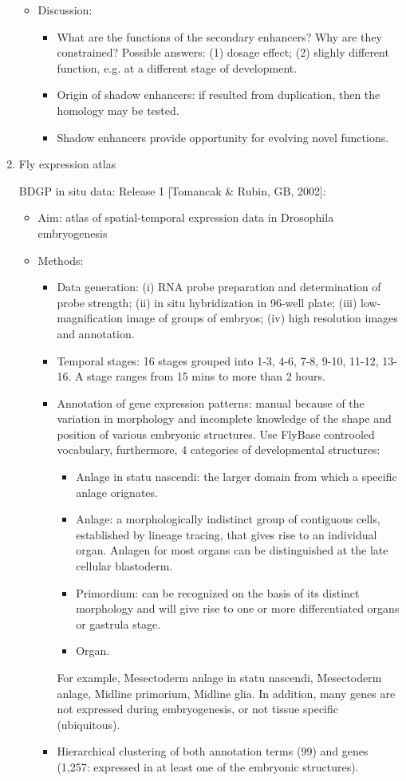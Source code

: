 \documentclass{report}
\begin{document}
\begin{enumerate}
\begin{itemize}
		\item Discussion: 
		\begin{itemize}
			\item What are the functions of the secondary enhancers? Why are they constrained? Possible answers: (1) dosage effect; (2) slighly different function, e.g. at a different stage of development. 
			\item Origin of shadow enhancers: if resulted from duplication, then the homology may be tested. 
			\item Shadow enhancers provide opportunity for evolving novel functions. 
		\end{itemize}
	\end{itemize}
	
	\item{Fly expression atlas}
	
	BDGP in situ data: Release 1 [Tomancak \& Rubin, GB, 2002]:
	\begin{itemize}
		\item Aim: atlas of spatial-temporal expression data in Drosophila embryogenesis
		
		\item Methods: 
		\begin{itemize}
			\item Data generation: (i) RNA probe preparation and determination of probe strength; (ii) in situ hybridization in 96-well plate; (iii) low-magnification image of groups of embryos; (iv) high resolution images and annotation. 
			\item Temporal stages: 16 stages grouped into 1-3, 4-6, 7-8, 9-10, 11-12, 13-16. A stage ranges from 15 mins to more than 2 hours. 
			\item Annotation of gene expression patterns: manual because of the variation in morphology and incomplete knowledge of the shape and position of various embryonic structures. Use FlyBase controoled vocabulary, furthermore, 4 categories of developmental structures: 
			\begin{itemize}
				\item Anlage in statu nascendi: the larger domain from which a specific anlage orignates. 
				\item Anlage: a morphologically indistinct group of contiguous cells, established by lineage tracing, that gives rise to an individual organ. Anlagen for most organs can be distinguished at the late cellular blastoderm. 
				\item Primordium: can be recognized on the basis of its distinct morphology and will give rise to one or more differentiated organs or gastrula stage. 
				\item Organ. 
			\end{itemize}
			For example, Mesectoderm anlage in statu nascendi, Mesectoderm anlage, Midline primorium, Midline glia. In addition, many genes are not expressed during embryogenesis, or not tissue specific (ubiquitous). 
			\item Hierarchical clustering of both annotation terms (99) and genes (1,257: expressed in at least one of the embryonic structures). 
		\end{itemize}
		

\end{itemize}
\end{enumerate}
\end{document}
